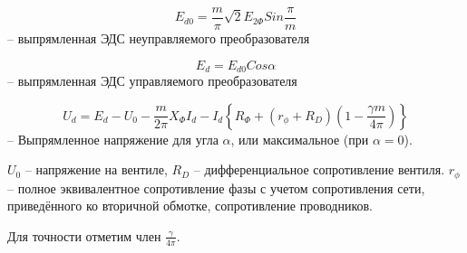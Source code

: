 \begin{equation}
E_{d0} = \frac{m}{\pi}\sqrt{2} E_{2\Phi} Sin\frac{\pi}{m}
\end{equation}
-- выпрямленная ЭДС неуправляемого преобразователя

\begin{equation}
E_d = E_{d0} Cos \alpha
\end{equation}
-- выпрямленная ЭДС управляемого преобразователя

\begin{equation}
U_d = E_{d} - U_0 - \frac{m}{2\pi} X_\Phi I_d - I_d \left\{
R_\Phi + \left(r_\phi + R_D\right) \left( 1 - \frac{\gamma m}{4 \pi}\right) 
\right\}
\label{three}
\end{equation}
-- Выпрямленное напряжение для угла $\alpha$, или максимальное (при $\alpha=0$).

$U_0$ -- напряжение на вентиле, $R_D$ -- дифференциальное сопротивление вентиля.
$r_\phi$ -- полное эквивалентное сопротивление фазы с учетом сопротивления сети,
приведённого ко вторичной обмотке, сопротивление проводников.

Для точности отметим член ${\displaystyle \frac{\gamma}{4\pi}}$.


